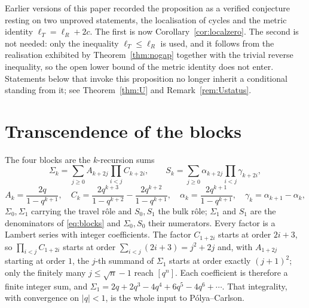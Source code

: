 \documentclass[11pt]{article}
\theoremstyle{plain}
\theoremstyle{definition}
\theoremstyle{remark}
\begin{document}
\noindent Earlier versions of this paper recorded the proposition as a verified conjecture resting
on two unproved statements, the localisation of cycles and the metric identity
$\ell_T=\ell_R+2c$. The first is now Corollary~\ref{cor:localzero}. The second is not needed: only
the inequality $\ell_T\le\ell_R$ is used, and it follows from the realisation exhibited by
Theorem~\ref{thm:nogap} together with the trivial reverse inequality, so the open lower bound of the
metric identity does not enter. Statements below that invoke this proposition no longer inherit a
conditional standing from it; see Theorem~\ref{thm:U} and Remark~\ref{rem:Ustatus}.

\section{Transcendence of the blocks}\label{sec:blocks}

The four blocks are the $k$-recursion sums
\begin{equation}\label{eq:krec}
  \Sigma_k=\sum_{j\ge0}A_{k+2j}\prod_{i<j}C_{k+2i},\qquad
  S_k=\sum_{j\ge0}\alpha_{k+2j}\prod_{i<j}\gamma_{k+2i},
\end{equation}
\[
  A_k=\frac{2q}{1-q^{k+1}},\quad
  C_k=\frac{2q^{k+3}}{1-q^{k+2}}-\frac{2q^{k+2}}{1-q^{k+1}},\quad
  \alpha_k=\frac{2q^{k+1}}{1-q^{k+1}},\quad
  \gamma_k=\alpha_{k+1}-\alpha_k ,
\]
$\Sigma_0,\Sigma_1$ carrying the travel r\^ole and $S_0,S_1$ the bulk r\^ole; $\Sigma_1$ and $S_1$
are the denominators of \eqref{eq:blocks} and $\Sigma_0,S_0$ their numerators. Every factor is a
Lambert series with integer coefficients. The factor $C_{1+2i}$ starts at order $2i+3$, so
$\prod_{i<j}C_{1+2i}$ starts at order $\sum_{i<j}(2i+3)=j^2+2j$ and, with $A_{1+2j}$ starting at
order $1$, the $j$-th summand of $\Sigma_1$ starts at order exactly $(j+1)^2$; only the finitely
many $j\le\sqrt n-1$ reach $[q^n]$. Each coefficient is therefore a finite integer sum, and
$\Sigma_1=2q+2q^3-4q^4+6q^5-4q^6+\cdots$. That integrality, with convergence on $|q|<1$, is the
whole input to P\'olya--Carlson.
\end{document}
